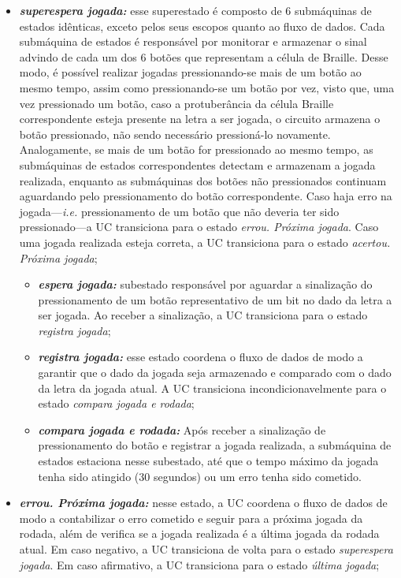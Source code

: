 \documentclass[amsmath,amssymb,floatfix]{report}
\begin{document}
\begin{itemize}
    \item \textbf{\textit{superespera jogada:}} esse superestado é composto de 6 submáquinas de estados idênticas, exceto pelos seus escopos quanto ao fluxo de dados. Cada submáquina de estados é responsável por monitorar e armazenar o sinal advindo de cada um dos 6 botões que representam a célula de Braille. Desse modo, é possível realizar jogadas pressionando-se mais de um botão ao mesmo tempo, assim como pressionando-se um botão por vez, visto que, uma vez pressionado um botão, caso a protuberância da célula Braille correspondente esteja presente na letra a ser jogada, o circuito armazena o botão pressionado, não sendo necessário pressioná-lo novamente. Analogamente, se mais de um botão for pressionado ao mesmo tempo, as submáquinas de estados correspondentes detectam e armazenam a jogada realizada, enquanto as submáquinas dos botões não pressionados continuam aguardando pelo pressionamento do botão correspondente. Caso haja erro na jogada---\textit{i.e.} pressionamento de um botão que não deveria ter sido pressionado---a UC transiciona para o estado \textit{errou. Próxima jogada}. Caso uma jogada realizada esteja correta, a UC transiciona para o estado \textit{acertou. Próxima jogada};
    \begin{itemize}
        \item \textbf{\textit{espera jogada:}} subestado responsável por aguardar a sinalização do pressionamento de um botão representativo de um bit no dado da letra a ser jogada. Ao receber a sinalização, a UC transiciona para o estado \textit{registra jogada};
        \item \textbf{\textit{registra jogada:}} esse estado coordena o fluxo de dados de modo a garantir que o dado da jogada seja armazenado e comparado com o dado da letra da jogada atual. A UC transiciona incondicionavelmente para o estado \textit{compara jogada e rodada};
        \item \textbf{\textit{compara jogada e rodada:}} Após receber a sinalização de pressionamento do botão e registrar a jogada realizada, a submáquina de estados estaciona nesse subestado, até que o tempo máximo da jogada tenha sido atingido (30 segundos) ou um erro tenha sido cometido.
    \end{itemize}
    \item \textbf{\textit{errou. Próxima jogada:}} nesse estado, a UC coordena o fluxo de dados de modo a contabilizar o erro cometido e seguir para a próxima jogada da rodada, além de verifica se a jogada realizada é a última jogada da rodada atual. Em caso negativo, a UC transiciona de volta para o estado \textit{superespera jogada}. Em caso afirmativo, a UC transiciona para o estado \textit{última jogada};

\end{itemize}
\end{document}
